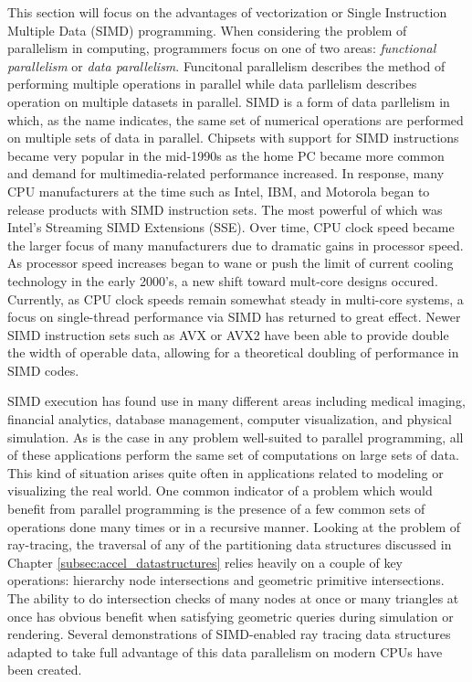 \documentclass[12pt, a4paper]{article}
\begin{document}
This section will focus on the advantages of vectorization or Single Instruction Multiple Data (SIMD) programming. When considering the problem of parallelism in computing, programmers focus on one of two areas: \textit{functional parallelism} or \textit{data parallelism}. Funcitonal parallelism describes the method of performing multiple operations in parallel while data parllelism describes operation on multiple datasets in parallel. SIMD is a form of data parllelism in which, as the name indicates, the same set of numerical operations are performed on multiple sets of data in parallel. Chipsets with support for SIMD instructions became very popular in the mid-1990s as the home PC became more common and demand for multimedia-related performance increased. In response, many CPU manufacturers at the time such as Intel, IBM, and Motorola began to release products with SIMD instruction sets. The most powerful of which was Intel's Streaming SIMD Extensions (SSE). Over time, CPU clock speed became the larger focus of many manufacturers due to dramatic gains in processor speed. As processor speed increases began to wane or push the limit of current cooling technology in the early 2000's, a new shift toward mult-core designs occured. Currently, as CPU clock speeds remain somewhat steady in multi-core systems, a focus on single-thread performance via SIMD has returned to great effect. Newer SIMD instruction sets such as AVX or AVX2 have been able to provide double the width of operable data, allowing for a theoretical doubling of performance in SIMD codes. \cite{Hughes_2015}

SIMD execution has found use in many different areas including medical imaging, financial analytics, database management, computer visualization, and physical simulation. As is the case in any problem well-suited to parallel programming, all of these applications perform the same set of computations on large sets of data. This kind of situation arises quite often in applications related to modeling or visualizing the real world. One common indicator of a problem which would benefit from parallel programming is the presence of a few common sets of operations done many times or in a recursive manner. Looking at the problem of ray-tracing, the traversal of any of the partitioning data structures discussed in Chapter \ref{subsec:accel_datastructures} relies heavily on a couple of key operations: hierarchy node intersections and geometric primitive intersections. The ability to do intersection checks of many nodes at once or many triangles at once has obvious benefit when satisfying geometric queries during simulation or rendering. Several demonstrations of SIMD-enabled ray tracing data structures adapted to take full advantage of this data parallelism on modern CPUs have been created.
\end{document}
